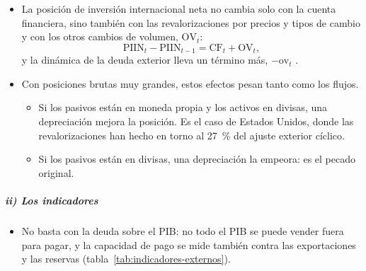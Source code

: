 \documentclass[11pt]{article}
\begin{document}
\begin{itemize}
\item La posición de inversión internacional neta no cambia solo con la cuenta financiera, sino también con las revalorizaciones por precios y tipos de cambio y con los otros cambios de volumen, $\mathrm{OV}_t$:
  \[
  \mathrm{PIIN}_t-\mathrm{PIIN}_{t-1}=\mathrm{CF}_t+\mathrm{OV}_t ,
  \]
  y la dinámica de la deuda exterior lleva un término más, $-\mathrm{ov}_t$ .
\item Con posiciones brutas muy grandes, estos efectos pesan tanto como los flujos\nocite{LaneMilesiFerretti2007,LaneMilesiFerretti2018}.
  \begin{itemize}
  \item Si los pasivos están en moneda propia y los activos en divisas, una depreciación mejora la posición. Es el caso de Estados Unidos, donde las revalorizaciones han hecho en torno al 27~\% del ajuste exterior cíclico\nocite{GourinchasRey2007International}.
  \item Si los pasivos están en divisas, una depreciación la empeora: es el pecado original.
  \end{itemize}
\end{itemize}

\subparagraph{ii) Los indicadores}

\begin{itemize}
\item No basta con la deuda sobre el PIB: no todo el PIB se puede vender fuera para pagar, y la capacidad de pago se mide también contra las exportaciones y las reservas (tabla~\ref{tab:indicadores-externos}).
\end{itemize}
\end{document}
